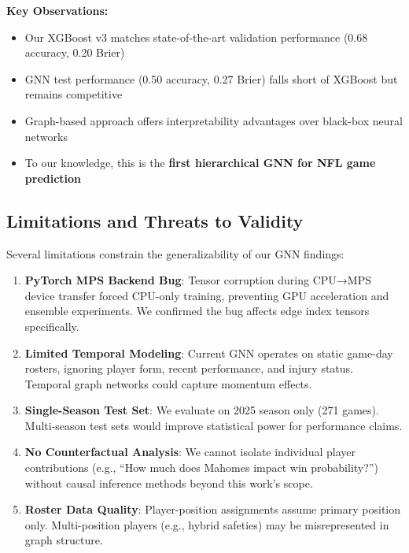 \textbf{Key Observations:}
\begin{itemize}[noitemsep]
    \item Our XGBoost v3 matches state-of-the-art validation performance (0.68 accuracy, 0.20 Brier)
    \item GNN test performance (0.50 accuracy, 0.27 Brier) falls short of XGBoost but remains competitive
    \item Graph-based approach offers interpretability advantages over black-box neural networks
    \item To our knowledge, this is the \textbf{first hierarchical GNN for NFL game prediction}
\end{itemize}

\subsection{Limitations and Threats to Validity}
\label{subsec:gnn_limitations}

Several limitations constrain the generalizability of our GNN findings:

\begin{enumerate}[noitemsep]
    \item \textbf{PyTorch MPS Backend Bug}: Tensor corruption during CPU→MPS device transfer forced CPU-only training, preventing GPU acceleration and ensemble experiments. We confirmed the bug affects edge index tensors specifically.

    \item \textbf{Limited Temporal Modeling}: Current GNN operates on static game-day rosters, ignoring player form, recent performance, and injury status. Temporal graph networks could capture momentum effects.

    \item \textbf{Single-Season Test Set}: We evaluate on 2025 season only (271 games). Multi-season test sets would improve statistical power for performance claims.

    \item \textbf{No Counterfactual Analysis}: We cannot isolate individual player contributions (e.g., ``How much does Mahomes impact win probability?'') without causal inference methods beyond this work's scope.

    \item \textbf{Roster Data Quality}: Player-position assignments assume primary position only. Multi-position players (e.g., hybrid safeties) may be misrepresented in graph structure.
\end{enumerate}

